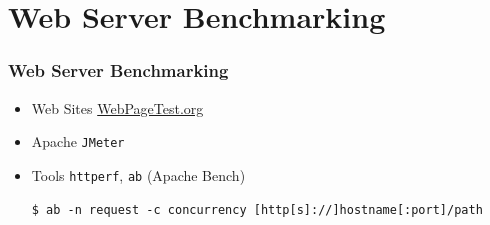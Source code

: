 \documentclass{beamer}
\begin{document}
\section{Web Server Benchmarking}
\begin{frame}[fragile]
\frametitle{Web Server Benchmarking}
\begin{itemize}
  \item Web Sites \url{WebPageTest.org}
  \item Apache  \texttt{JMeter}
  \item Tools \texttt{httperf}, \texttt{ab} (Apache Bench)
\lstset{language=shell}
\begin{lstlisting}[escapechar=!]
$ ab -n request -c concurrency [http[s]://]hostname[:port]/path
\end{lstlisting}
   \end{itemize}
\end{frame}
\end{document}
